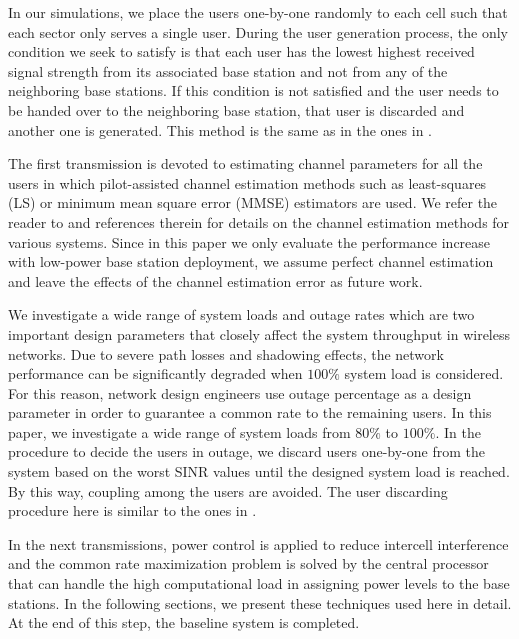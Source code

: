 \documentclass[conference,letterpaper,final,10pt]{IEEEtran}
\begin{document}
In our simulations, we place the users one-by-one randomly to each cell such that each sector only serves a single user. During the user generation process, the only condition we seek to satisfy is that each user has the lowest highest received signal strength from its associated base station and not from any of the neighboring base stations. If this condition is not satisfied and the user needs to be handed over to the neighboring base station, that user is discarded and another one is generated. This method is the same as in the ones in \cite{RamanConf,Karakayali}.

The first transmission is devoted to estimating channel parameters for all the users in which pilot-assisted channel estimation methods such as least-squares (LS) or minimum mean square error (MMSE) estimators are used. We refer the reader to \cite{channelest1,channelest2,channelest3} and references therein for details on the channel estimation methods for various systems. Since in this paper we only evaluate the performance increase with low-power base station deployment, we assume perfect channel estimation and leave the effects of the channel estimation error as future work.

We investigate a wide range of system loads and outage rates which are two important design parameters that closely affect the system throughput in wireless networks. Due to severe path losses and shadowing effects, the network performance can be significantly degraded when $100\%$ system load is considered. For this reason, network design engineers use outage percentage as a design parameter in order to guarantee a common rate to the remaining users. In this paper, we investigate a wide range of system loads from $80\%$ to $100\%$. In the procedure to decide the users in outage, we discard users one-by-one from the system based on the worst SINR values until the designed system load is reached. By this way, coupling among the users are avoided. The user discarding procedure here is similar to the ones in \cite{Karakayali,RamanConf}.

In the next transmissions, power control is applied to reduce intercell interference and the common rate maximization problem is solved by the central processor that can handle the high computational load in assigning power levels to the base stations. In the following sections, we present these techniques used here in detail. At the end of this step, the baseline system is completed.
\end{document}
